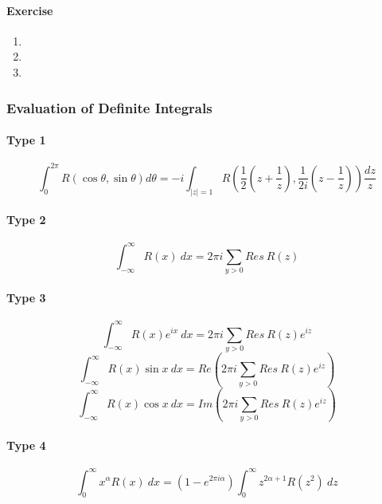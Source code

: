 \paragraph{Exercise}
\begin{enumerate}
	\item
	\item
	\item
\end{enumerate}
\subsubsection{Evaluation of Definite Integrals}
\paragraph{Type 1}
\begin{equation}
	\int_0^{2\pi} R(\cos \theta,\sin \theta) d\theta = -i\int_{|z|=1} \!\!\! R\left(\frac{1}{2}(z+\frac{1}{z}),\frac{1}{2i}(z-\frac{1}{z}) \right) \frac{dz}{z}
\end{equation}

\paragraph{Type 2}
\begin{equation}
	\int_{-\infty}^\infty R(x)\ dx = 2\pi i \sum_{y>0} Res\ R(z)
\end{equation}

\paragraph{Type 3}
\begin{equation}
	\int_{-\infty}^\infty R(x)e^{ix}\ dx = 2\pi i \sum_{y > 0} Res\ R(z)e^{iz}
\end{equation}
\begin{equation}
	\int_{-\infty}^\infty R(x) \sin x\ dx = Re \left( 2\pi i \sum_{y > 0} Res\ R(z)e^{iz} \right)
\end{equation}
\begin{equation}
	\int_{-\infty}^\infty R(x) \cos x\ dx = Im \left( 2\pi i \sum_{y > 0} Res\ R(z)e^{iz} \right)
\end{equation}

\paragraph{Type 4}
\begin{equation}
	\int_0^\infty x^\alpha R(x)\ dx	= (1-e^{2\pi i \alpha})\int_0^\infty z^{2\alpha+1} R(z^2)\ dz
\end{equation}

